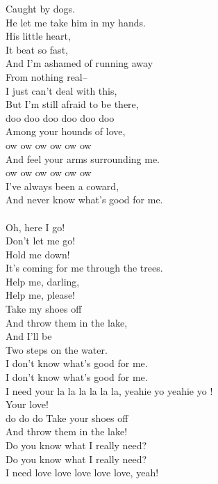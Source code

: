   Caught by dogs.\\
  He let me take him in my hands.\\
  His little heart,\\
  It beat so fast,\\
  And I'm ashamed of running away\\
  From nothing real--\\
  I just can't deal with this,\\
  But I'm still afraid to be there,\\
  doo doo doo doo doo doo\\
  Among your hounds of love,\\
  ow ow ow ow ow ow\\
  And feel your arms surrounding me.\\
  ow ow ow ow ow ow\\
  I've always been a coward,\\
  And never know what's good for me.\\
  \\
  Oh, here I go!\\
  Don't let me go!\\
  Hold me down!\\
  It's coming for me through the trees.\\
  Help me, darling,\\
  Help me, please!\\
  Take my shoes off\\
  And throw them in the lake,\\
  And I'll be\\
  Two steps on the water. \\
  I don't know what's good for me.\\
  I don't know what's good for me.\\
  I need your la la la la la la, yeahie yo yeahie yo !\\
  Your love!\\
  do do do
  Take your shoes off\\
  And throw them in the lake!\\
  Do you know what I really need?\\
  Do you know what I really need?\\
  I need love love love love love, yeah!\\
